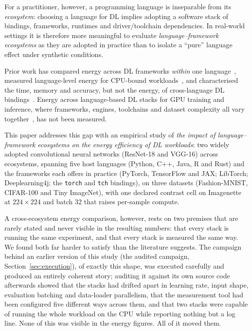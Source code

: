 For a practitioner, however, a programming language is inseparable from its \emph{ecosystem}: choosing a language for DL implies adopting a software stack of bindings, frameworks, runtimes and driver/toolchain dependencies. In real-world settings it is therefore more meaningful to evaluate \emph{language--framework ecosystems} as they are adopted in practice than to isolate a ``pure'' language effect under synthetic conditions.

Prior work has compared energy across DL frameworks \emph{within} one language~\citep{georgiou2022green,alizadeh2024energy}, measured language-level energy for CPU-bound workloads~\citep{pereira2021ranking,gordillo2024ranking}, and characterised the time, memory and accuracy, but not the energy, of cross-language DL bindings~\citep{li2024bindings}. Energy across language-based DL stacks for GPU training and inference, where frameworks, engines, toolchains and dataset complexity all vary together~\citep{weber2023twins}, has not been measured.

This paper addresses this gap with an empirical study of \emph{the impact of language--framework ecosystems on the energy efficiency of DL workloads}: two widely adopted convolutional neural networks (ResNet-18 and VGG-16) across \vEcosystems{} ecosystems, spanning five host languages (Python, C++, Java, R and Rust) and the frameworks each offers in practice (PyTorch, TensorFlow and JAX; LibTorch; Deeplearning4j; the \texttt{torch} and \texttt{tch} bindings), on three datasets (Fashion-MNIST, CIFAR-100 and Tiny ImageNet), with one declared contrast cell on Imagenette at $224\times224$ and batch 32 that raises per-sample compute.

A cross-ecosystem energy comparison, however, rests on two premises that are rarely stated and never visible in the resulting numbers: that every stack is running the same experiment, and that every stack is measured the same way. We found both far harder to satisfy than the literature suggests. The campaign behind an earlier version of this study (the audited campaign, Section~\ref{sec:execution}), of exactly this shape, was executed carefully and produced an entirely coherent story; auditing it against its own source code afterwards showed that the stacks had drifted apart in learning rate, input shape, evaluation batching and data-loader parallelism, that the measurement tool had been configured five different ways across them, and that two stacks were capable of running the whole workload on the CPU while reporting nothing but a log line. None of this was visible in the energy figures. All of it moved them.

